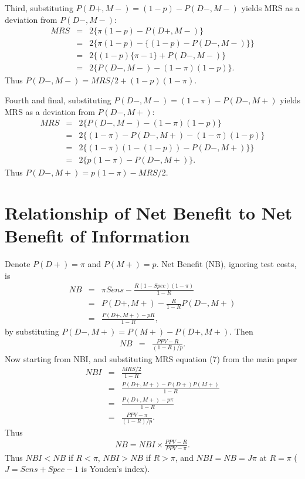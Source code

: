 \documentclass[AMA,STIX1COL]{WileyNJD-v2}
\begin{document}
Third, substituting $P(D+,M-)=(1-p)-P(D-,M-)$ yields MRS as a deviation from $P(D-,M-)$:
\begin{eqnarray*}
	MRS &=& 2\{\pi(1-p) - P(D+,M-)\} \\
	&=& 2\{\pi(1-p) - \{(1-p)-P(D-,M-)\}\} \\
	&=& 2\{(1-p)\{\pi-1\} +P(D-,M-)\} \\
	&=& 2\{P(D-,M-) - (1-\pi)(1-p)\}.
\end{eqnarray*}
Thus $P(D-,M-) = MRS/2 + (1-p)(1-\pi)$.

Fourth and final, substituting $P(D-,M-)=(1-\pi)-P(D-,M+)$ yields MRS as a deviation from $P(D-,M+)$:
\begin{eqnarray*}
	MRS &=& 2\{P(D-,M-) - (1-\pi)(1-p)\} \\
	&=& 2\{(1-\pi)-P(D-,M+) - (1-\pi)(1-p)\}\\
	&=& 2\{(1-\pi)(1-(1-p)) - P(D-,M+)\}\} \\
	&=& 2\{p(1-\pi) - P(D-,M+)\}.
\end{eqnarray*}
Thus $P(D-,M+) = p(1-\pi) - MRS/2$.

\section{Relationship of Net Benefit to Net Benefit of Information}
\label{(NBandNBI}

Denote $P(D+)=\pi$ and $P(M+)=p$.  Net Benefit (NB), ignoring test costs, is
\begin{eqnarray*}
	NB &=& \pi Sens-\frac{R(1-Spec)(1-\pi)}{1-R} \\
	&=& P(D+,M+)-\frac{R}{1-R}P(D-,M+) \\
	&=& \frac{P(D+,M+)-pR}{1-R},
\end{eqnarray*}
by substituting $P(D-,M+)=P(M+)-P(D+,M+)$.  Then
\begin{eqnarray*}
	NB &=& \frac{PPV-R}{(1-R)/p}.
\end{eqnarray*}
Now starting from NBI, and substituting MRS equation (7) from the main paper
\begin{eqnarray*}
	NBI &=& \frac{MRS/2}{1-R}\\
	&=& \frac{P(D+,M+)-P(D+)P(M+)}{1-R}\\
	&=& \frac{P(D+,M+)-p\pi}{1-R} \\
	&=& \frac{PPV-\pi}{(1-R)/p}.
\end{eqnarray*}
Thus
\begin{eqnarray*}
	NB = NBI\times \frac{PPV-R}{PPV-\pi}.
\end{eqnarray*}  
Thus $NBI<NB$ if $R<\pi$, $NBI>NB$ if $R>\pi$, and $NBI=NB=J\pi$ at $R=\pi$ ($J=Sens+Spec-1$ is Youden's index).
\end{document}

